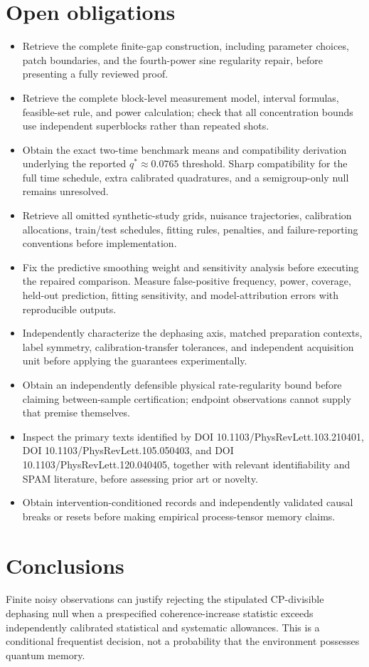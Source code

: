 \documentclass[11pt]{article}
\begin{document}
\section{Open obligations}
\begin{itemize}
\item Retrieve the complete finite-gap construction, including parameter choices, patch boundaries, and the fourth-power sine regularity repair, before presenting a fully reviewed proof.
\item Retrieve the complete block-level measurement model, interval formulas, feasible-set rule, and power calculation; check that all concentration bounds use independent superblocks rather than repeated shots.
\item Obtain the exact two-time benchmark means and compatibility derivation underlying the reported $q^*\approx0.0765$ threshold. Sharp compatibility for the full time schedule, extra calibrated quadratures, and a semigroup-only null remains unresolved.
\item Retrieve all omitted synthetic-study grids, nuisance trajectories, calibration allocations, train/test schedules, fitting rules, penalties, and failure-reporting conventions before implementation.
\item Fix the predictive smoothing weight and sensitivity analysis before executing the repaired comparison. Measure false-positive frequency, power, coverage, held-out prediction, fitting sensitivity, and model-attribution errors with reproducible outputs.
\item Independently characterize the dephasing axis, matched preparation contexts, label symmetry, calibration-transfer tolerances, and independent acquisition unit before applying the guarantees experimentally.
\item Obtain an independently defensible physical rate-regularity bound before claiming between-sample certification; endpoint observations cannot supply that premise themselves.
\item Inspect the primary texts identified by DOI 10.1103/PhysRevLett.103.210401, DOI 10.1103/PhysRevLett.105.050403, and DOI 10.1103/PhysRevLett.120.040405, together with relevant identifiability and SPAM literature, before assessing prior art or novelty.
\item Obtain intervention-conditioned records and independently validated causal breaks or resets before making empirical process-tensor memory claims.
\end{itemize}
\section{Conclusions}
Finite noisy observations can justify rejecting the stipulated CP-divisible dephasing null when a prespecified coherence-increase statistic exceeds independently calibrated statistical and systematic allowances. This is a conditional frequentist decision, not a probability that the environment possesses quantum memory.
\end{document}
